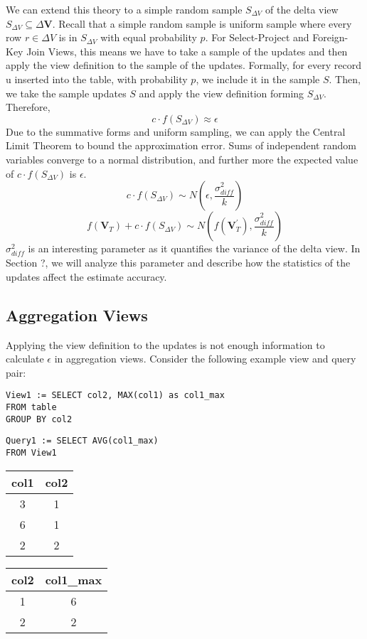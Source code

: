 We can extend this theory to a simple random sample $S_{\Delta V}$
of the delta view $S_{\Delta V}\subseteq\Delta\textbf{V}$. Recall
that a simple random sample is uniform sample where every row $r\in\Delta V$
is in $S_{\Delta V}$ with equal probability $p$. For Select-Project
and Foreign-Key Join Views, this means we have to take a sample of
the updates and then apply the view definition to the sample of the
updates. Formally, for every record u inserted into the table, with
probability $p$, we include it in the sample $S$. Then, we take
the sample updates $S$ and apply the view definition forming $S_{\Delta V}$.
Therefore,
\[
c\cdot f(S_{\Delta V})\approx\epsilon
\]
Due to the summative forms and uniform sampling, we can apply the
Central Limit Theorem to bound the approximation error. Sums of independent
random variables converge to a normal distribution, and further more
the expected value of $c\cdot f(S_{\Delta V})$ is $\epsilon$. 
\[
c\cdot f(S_{\Delta V})\sim N(\epsilon,\frac{\sigma_{diff}^{2}}{k})
\]
\[
f(\textbf{V}_{T})+c\cdot f(S_{\Delta V})\sim N(f(\textbf{V}_{T}^{'}),\frac{\sigma_{diff}^{2}}{k})
\]
$\sigma_{diff}^{2}$ is an interesting parameter as it quantifies
the variance of the delta view. In Section ?, we will analyze this
parameter and describe how the statistics of the updates affect the
estimate accuracy.


\subsection{Aggregation Views}

Applying the view definition to the updates is not enough information
to calculate $\epsilon$ in aggregation views. Consider the following
example view and query pair:

\begin{lstlisting}
View1 := SELECT col2, MAX(col1) as col1_max
FROM table 
GROUP BY col2
\end{lstlisting}


\begin{lstlisting}
Query1 := SELECT AVG(col1_max) 
FROM View1 
\end{lstlisting}


\begin{center}
\begin{tabular}{|c|c|}
\hline 
col1 & col2\tabularnewline
\hline 
\hline 
3 & 1\tabularnewline
\hline 
6 & 1\tabularnewline
\hline 
2 & 2\tabularnewline
\hline 
\end{tabular} %
\begin{tabular}{|c|c|}
\hline 
col2 & col1\_max\tabularnewline
\hline 
\hline 
1 & 6\tabularnewline
\hline 
2 & 2\tabularnewline
\hline 
\end{tabular}
\par\end{center}

